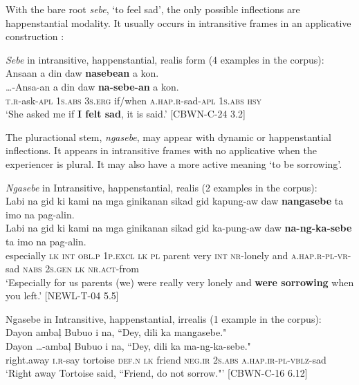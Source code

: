 With the bare root \textit{sebe}, ‘to feel sad’, the only possible inflections are happenstantial modality. It usually occurs in intransitive frames in an applicative construction :

\ea
\label{ex:feltsad}
\textit{Sebe} in intransitive, happenstantial, realis form (4 examples in the corpus): \\
Ansaan  a  din  daw  \textbf{nasebean}  a  kon. \\\smallskip
\gll  …-Ansa-an  a  din  daw  \textbf{na-sebe-an}  a  kon. \\
\textsc{t.r}-ask-\textsc{apl}  1\textsc{s.abs}  3\textsc{s.erg}  if/when  \textsc{a.hap.r}-sad-\textsc{apl}  1\textsc{s.abs}  \textsc{hsy} \\
\glt ‘She asked me if \textbf{I felt sad}, it is said.’ [CBWN-C-24 3.2]
\z

The pluractional stem, \textit{ngasebe}, may appear with dynamic or happenstantial inflections.  It appears in intransitive frames with no applicative when the experiencer is plural. It may also have a more active meaning ‘to be sorrowing’. 

\ea
\textit{Ngasebe} in Intransitive, happenstantial, realis (2 examples in the corpus): \\
Labi  na  gid  ki  kami  na  mga  ginikanan   sikad  gid kapung-aw daw  \textbf{nangasebe}  ta  imo  na  pag-alin.\\\smallskip
\gll Labi  na  gid  ki  kami  na  mga  ginikanan   sikad  gid ka-pung-aw daw  \textbf{na-ng-ka-sebe}  ta  imo  na  pag-alin.\\
especially  \textsc{lk}  \textsc{int}  \textsc{obl.p}  1\textsc{p.excl}  \textsc{lk}  \textsc{pl}  parent  very  \textsc{int}
\textsc{nr}-lonely
and  \textsc{a.hap.r}-\textsc{pl}-\textsc{vr}-sad  \textsc{nabs}  2\textsc{s.gen}  \textsc{lk} \textsc{nr.act}-from \\
\glt `Especially for us parents (we) were really very lonely and \textbf{were sorrowing} when you left.’ [NEWL-T-04 5.5]
\z

\ea
Ngasebe in Intransitive, happenstantial, irrealis (1 example in the corpus): \\
Dayon	ambaļ	Bubuo	i	na,	“Dey,	dili	ka	mangasebe." \\\smallskip
\gll Dayon	 …-ambaļ	Bubuo	i	na,	“Dey,	dili	ka	ma-ng-ka-sebe." \\
right.away	\textsc{i.r}-say	tortoise	\textsc{def.n}	\textsc{lk}	friend	\textsc{neg.ir}	2\textsc{s.abs}	\textsc{a.hap.ir}-\textsc{pl}-\textsc{vblz}-sad \\
\glt ‘Right away Tortoise said, “Friend, do not sorrow."' [CBWN-C-16 6.12]
\z


